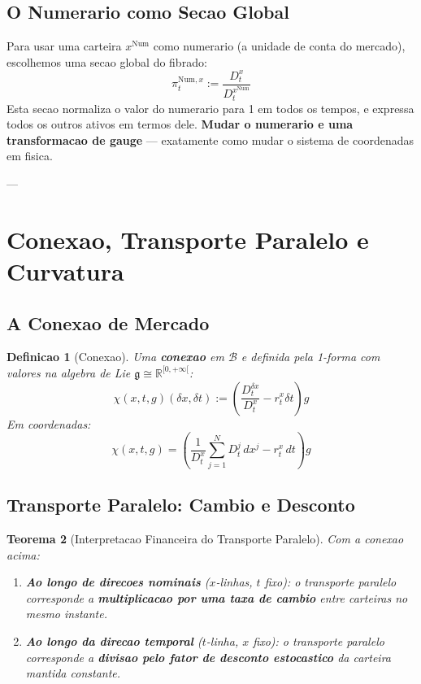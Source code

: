 \documentclass[12pt,a4paper]{article}
\newtheorem{teo}{Teorema}[section]
\newtheorem{defi}[teo]{Definicao}
\theoremstyle{remark}
\begin{document}
\subsection{O Numerario como Secao Global}

Para usar uma carteira $x^{\text{Num}}$ como numerario (a unidade de conta do
mercado), escolhemos uma secao global do fibrado:
\[
\pi_t^{\text{Num},x} := \frac{D_t^x}{D_t^{x^{\text{Num}}}}
\]
Esta secao normaliza o valor do numerario para 1 em todos os tempos, e expressa
todos os outros ativos em termos dele. \textbf{Mudar o numerario e uma
transformacao de gauge} — exatamente como mudar o sistema de coordenadas em
fisica.

---

\section{Conexao, Transporte Paralelo e Curvatura}

\subsection{A Conexao de Mercado}

\begin{defi}[Conexao]
Uma \textbf{conexao} em $\mathcal{B}$ e definida pela 1-forma com valores na
algebra de Lie $\mathfrak{g} \cong \mathbb{R}^{[0,+\infty[}$:
\[
\chi(x,t,g)(\delta x, \delta t) := \left(\frac{D_t^{\delta x}}{D_t^x} - r_t^x\delta t\right) g
\]
Em coordenadas:
\[
\chi(x,t,g) = \left(\frac{1}{D_t^x}\sum_{j=1}^N D_t^j\, dx^j - r_t^x\, dt\right) g
\]
\end{defi}

\subsection{Transporte Paralelo: Cambio e Desconto}

\begin{teo}[Interpretacao Financeira do Transporte Paralelo]
Com a conexao acima:
\begin{enumerate}[nosep]
  \item \textbf{Ao longo de direcoes nominais} ($x$-linhas, $t$ fixo): o
        transporte paralelo corresponde a \textbf{multiplicacao por uma taxa
        de cambio} entre carteiras no mesmo instante.
  \item \textbf{Ao longo da direcao temporal} ($t$-linha, $x$ fixo): o
        transporte paralelo corresponde a \textbf{divisao pelo fator de
        desconto estocastico} da carteira mantida constante.
\end{enumerate}
\end{teo}
\end{document}
